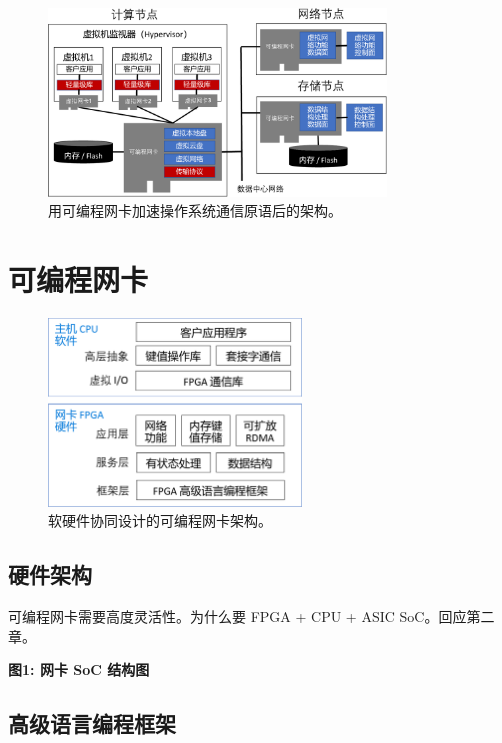 \begin{figure}[htbp]
	\centering
	\includegraphics[width=0.8\textwidth]{figures/os_primitives_accel.pdf}
	\caption{用可编程网卡加速操作系统通信原语后的架构。}
	\label{arch:fig:os-primitives-accel}
\end{figure}


\section{可编程网卡}



\begin{figure}[htbp]
	\centering
	\includegraphics[width=0.6\textwidth]{figures/sw_hw_codesign.pdf}
	\caption{软硬件协同设计的可编程网卡架构。}
	\label{arch:fig:sw-hw-codesign}
\end{figure}


\subsection{硬件架构}

可编程网卡需要高度灵活性。为什么要 FPGA + CPU + ASIC SoC。回应第二章。

\textbf{图1: 网卡 SoC 结构图}

\subsection{高级语言编程框架}

